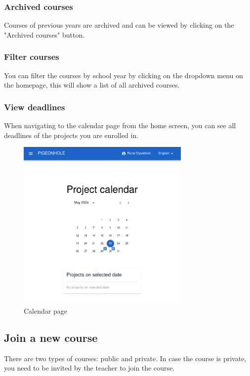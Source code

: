 \documentclass{article}
\begin{document}
\subsubsection{Archived courses}
Courses of previous years are archived and can be viewed by clicking on the "Archived courses" button.

\subsubsection{Filter courses}
You can filter the courses by school year by clicking on the dropdown menu on the homepage, this will show a list of all archived courses.

\subsubsection{View deadlines}
When navigating to the calendar page from the home screen, you can see all deadlines of the projects you are enrolled in. 

\begin{figure}[H]
    \centering
    \includegraphics[width=0.75\textwidth]{images/calendar.png}
    \caption{Calendar page}
\end{figure}

\subsection{Join a new course}
There are two types of courses: public and private.
In case the course is private, you need to be invited by the teacher to join the course.
\end{document}
